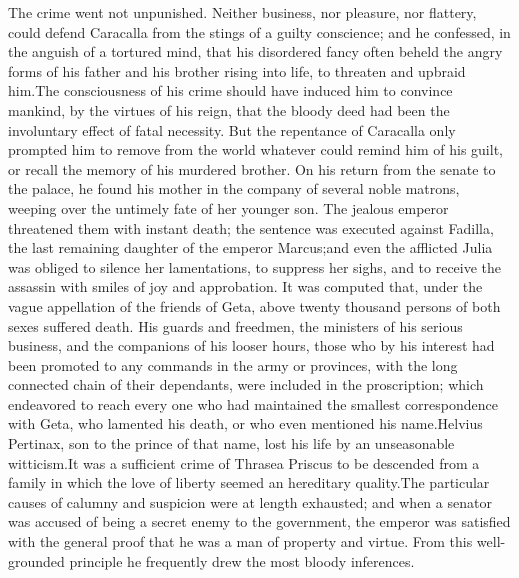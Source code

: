 The crime went not unpunished. Neither business, nor pleasure,
nor flattery, could defend Caracalla from the stings of a guilty
conscience; and he confessed, in the anguish of a tortured mind,
that his disordered fancy often beheld the angry forms of his
father and his brother rising into life, to threaten and upbraid
him.\footnotemark[25] The consciousness of his crime should have induced him to
convince mankind, by the virtues of his reign, that the bloody
deed had been the involuntary effect of fatal necessity. But the
repentance of Caracalla only prompted him to remove from the
world whatever could remind him of his guilt, or recall the
memory of his murdered brother. On his return from the senate to
the palace, he found his mother in the company of several noble
matrons, weeping over the untimely fate of her younger son. The
jealous emperor threatened them with instant death; the sentence
was executed against Fadilla, the last remaining daughter of the
emperor Marcus;\footnotemark[251] and even the afflicted Julia was obliged to
silence her lamentations, to suppress her sighs, and to receive
the assassin with smiles of joy and approbation. It was computed
that, under the vague appellation of the friends of Geta, above
twenty thousand persons of both sexes suffered death. His guards
and freedmen, the ministers of his serious business, and the
companions of his looser hours, those who by his interest had
been promoted to any commands in the army or provinces, with the
long connected chain of their dependants, were included in the
proscription; which endeavored to reach every one who had
maintained the smallest correspondence with Geta, who lamented
his death, or who even mentioned his name.\footnotemark[26] Helvius Pertinax,
son to the prince of that name, lost his life by an unseasonable
witticism.\footnotemark[27] It was a sufficient crime of Thrasea Priscus to be
descended from a family in which the love of liberty seemed an
hereditary quality.\footnotemark[28] The particular causes of calumny and
suspicion were at length exhausted; and when a senator was
accused of being a secret enemy to the government, the emperor
was satisfied with the general proof that he was a man of
property and virtue. From this well-grounded principle he
frequently drew the most bloody inferences.\footnotemark[281]



